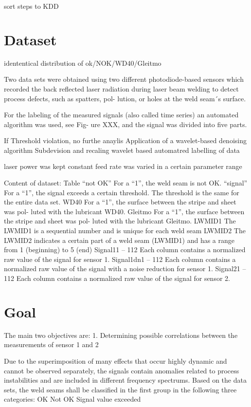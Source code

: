 \documentclass[12pt]{report}
\begin{document}
sort steps to KDD






\section{Dataset}

idententical distribution of ok/NOK/WD40/Gleitmo

Two data sets were obtained using two different
photodiode-based sensors which recorded the back reflected laser radiation
during laser beam welding to detect process defects, such as spatters, pol-
lution, or holes at the weld seam´s surface.

For the labeling of the measured signals (also called time series) an automated algorithm was used, see Fig-
ure XXX, and the signal was divided into five parts.

If Threshold violation, no furthe anaylis
Application of a wavelet-based denoising algorithm Subdevision and recaling 
wavelet based automatred labelling of data  

laser power was kept constant 
feed rate was varied in a certain parameter range

Content of dataset:
Table 
“not OK”
For a “1”, the weld seam is not OK.
“signal”
For a “1”, the signal exceeds a certain threshold. The threshold
is the same for the entire data set.
WD40
For a “1”, the surface between the stripe and sheet was pol-
luted with the lubricant WD40.
Gleitmo
For a “1”, the surface between the stripe and sheet was pol-
luted with the lubricant Gleitmo.
LWMID1
The LWMID1 is a sequential number and is unique for each
weld seam
LWMID2
The LWMID2 indicates a certain part of a weld seam
(LWMID1) and has a range from 1 (beginning) to 5 (end)
Signal11 – 112
Each column contains a normalized raw value of the signal for
sensor 1.
Signal1dn1 – 112
Each column contains a normalized raw value of the signal
with a noise reduction for sensor 1.
Signal21 – 112
Each column contains a normalized raw value of the signal for
sensor 2.


\section{Goal}
The main two objectives are:
1. Determining possible correlations between the measurements of
sensor 1 and 2

Due to the superimposition of many effects that occur highly dynamic and
cannot be observed separately, the signals contain anomalies related to
process instabilities and are included in different frequency spectrums.
Based on the data sets, the weld seams shall be classified in the first group
in the following three categories:
OK
Not OK
Signal value exceeded
\end{document}
